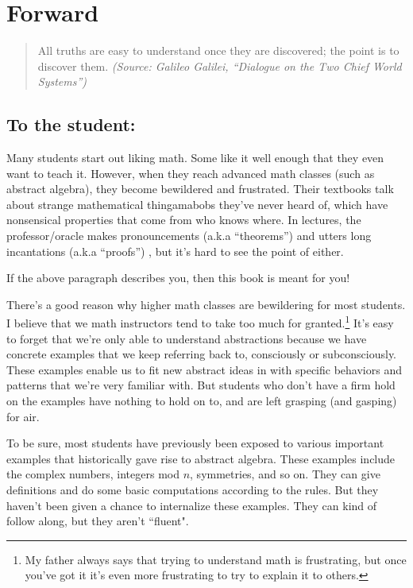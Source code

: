 \chapter*{Forward}

\begin{quote}
All truths are easy to understand once they are discovered; the point is to discover them.
\emph{(Source:  Galileo Galilei, ``Dialogue on the Two Chief World Systems'')}
\end{quote}

\section*{To the student:}
\medskip

Many students start out liking math. Some like it well enough that they even want to teach it. However, when they reach advanced math classes (such as abstract algebra), they become bewildered and frustrated. Their textbooks talk about strange mathematical thingamabobs they've never heard of, which have nonsensical properties that come from who knows where. In lectures, the professor/oracle  makes pronouncements (a.k.a ``theorems'') and utters long incantations (a.k.a ``proofs'') , but it's hard to see the point of either. 
\medskip

If the above paragraph describes you, then this book is meant for you!
\medskip

There's a good reason why higher math classes are bewildering for most students. I believe that we math instructors tend to take too much for granted.\footnote{My father always says that trying to understand math is frustrating, but once you've got it it's even more frustrating to try to explain it to others.} It's easy to forget that we're only able to understand abstractions because we have concrete examples that we keep referring back to, consciously or subconsciously. These examples enable us to fit new abstract ideas in with specific behaviors and patterns that we're very familiar with. But students who don't have a firm hold on the examples have nothing to hold on to, and are left grasping (and gasping) for air. 

To be sure, most students have previously been exposed to various important examples that historically gave rise to abstract algebra. These examples include the complex numbers, integers mod $n$, symmetries, and so on. They can give definitions and do some basic computations according to the rules. But they haven't been given a chance to internalize these examples.  They can kind of follow along, but they aren't ``fluent".

